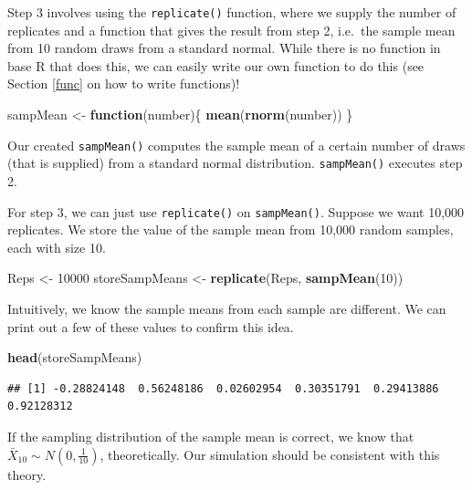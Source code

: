 \documentclass[
]{book}
\newenvironment{Shaded}{\begin{snugshade}}{\end{snugshade}}
\newcommand{\ControlFlowTok}[1]{\textcolor[rgb]{0.13,0.29,0.53}{\textbf{#1}}}
\newcommand{\DecValTok}[1]{\textcolor[rgb]{0.00,0.00,0.81}{#1}}
\newcommand{\FunctionTok}[1]{\textcolor[rgb]{0.13,0.29,0.53}{\textbf{#1}}}
\newcommand{\NormalTok}[1]{#1}
\newcommand{\OtherTok}[1]{\textcolor[rgb]{0.56,0.35,0.01}{#1}}
\theoremstyle{definition}
\theoremstyle{definition}
\theoremstyle{definition}
\theoremstyle{definition}
\theoremstyle{remark}
\begin{document}
Step 3 involves using the \texttt{replicate()} function, where we supply the number of replicates and a function that gives the result from step 2, i.e.~the sample mean from 10 random draws from a standard normal. While there is no function in base R that does this, we can easily write our own function to do this (see Section \ref{func} on how to write functions)!

\begin{Shaded}
\begin{Highlighting}[]
\NormalTok{sampMean }\OtherTok{\textless{}{-}} \ControlFlowTok{function}\NormalTok{(number)\{}
  \FunctionTok{mean}\NormalTok{(}\FunctionTok{rnorm}\NormalTok{(number))}
\NormalTok{\}}
\end{Highlighting}
\end{Shaded}

Our created \texttt{sampMean()} computes the sample mean of a certain number of draws (that is supplied) from a standard normal distribution. \texttt{sampMean()} executes step 2.

For step 3, we can just use \texttt{replicate()} on \texttt{sampMean()}. Suppose we want 10,000 replicates. We store the value of the sample mean from 10,000 random samples, each with size 10.

\begin{Shaded}
\begin{Highlighting}[]
\NormalTok{Reps }\OtherTok{\textless{}{-}} \DecValTok{10000}
\NormalTok{storeSampMeans }\OtherTok{\textless{}{-}} \FunctionTok{replicate}\NormalTok{(Reps, }\FunctionTok{sampMean}\NormalTok{(}\DecValTok{10}\NormalTok{))}
\end{Highlighting}
\end{Shaded}

Intuitively, we know the sample means from each sample are different. We can print out a few of these values to confirm this idea.

\begin{Shaded}
\begin{Highlighting}[]
\FunctionTok{head}\NormalTok{(storeSampMeans)}
\end{Highlighting}
\end{Shaded}

\begin{verbatim}
## [1] -0.28824148  0.56248186  0.02602954  0.30351791  0.29413886  0.92128312
\end{verbatim}

If the sampling distribution of the sample mean is correct, we know that \(\bar{X}_{10} \sim N(0, \frac{1}{10})\), theoretically. Our simulation should be consistent with this theory.
\end{document}
